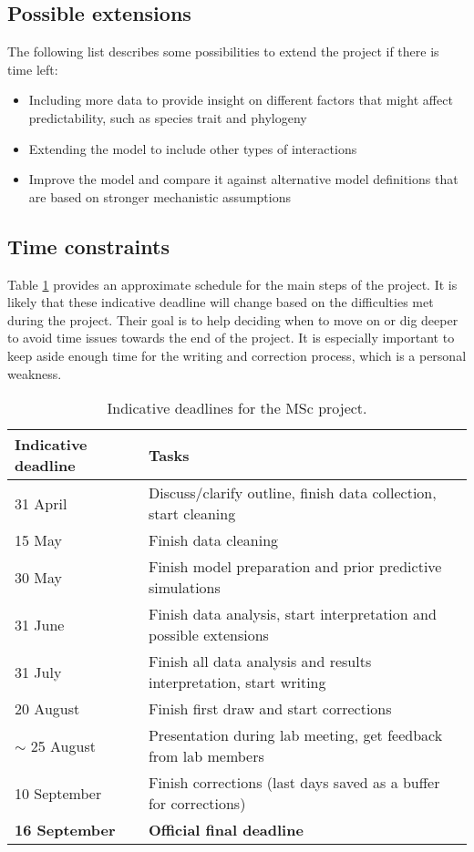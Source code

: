 \documentclass[12pt]{article}
\begin{document}
\subsection{Possible extensions}
The following list describes some possibilities to extend the project if there is time left:
\begin{itemize}
    \item Including more data to provide insight on different factors that might affect predictability, such as species trait and phylogeny
    \item Extending the model to include other types of interactions
    \item Improve the model and compare it against alternative model definitions that are based on stronger mechanistic assumptions
\end{itemize}

\subsection{Time constraints}
Table \ref{tab:schedule} provides an approximate schedule for the main steps of the project. It is likely that these indicative deadline will change based on the difficulties met during the project. Their goal is to help deciding when to move on or dig deeper to avoid time issues towards the end of the project. It is especially important to keep aside enough time for the writing and correction process, which is a personal weakness.

\begin{table}[tb]
    \begin{small}
    \centering
    \begin{tabular}{p{}|p{}}
        Indicative deadline & Tasks \\ \hline
        31 April & Discuss/clarify outline, finish data collection, start cleaning \\
        15 May & Finish data cleaning \\
        30 May & Finish model preparation and prior predictive simulations \\
        31 June & Finish data analysis, start interpretation and possible extensions \\
        31 July & Finish all data analysis and results interpretation, start writing \\
        20 August & Finish first draw and start corrections \\
        $\sim$ 25 August & Presentation during lab meeting, get feedback from lab members \\
        10 September & Finish corrections (last days saved as a buffer for corrections)\\ \hline
        \textbf{16 September} & \textbf{Official final deadline}
    \end{tabular}
    \caption{Indicative deadlines for the MSc project.}
    \label{tab:schedule}
    \end{small}
\end{table}

\pagestyle{plain*}
\printbibliography
\end{document}
